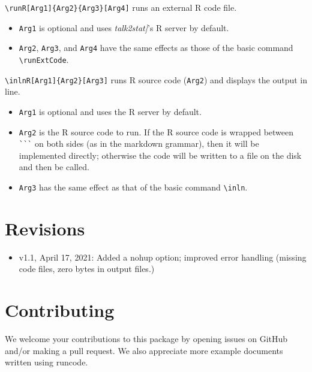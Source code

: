 \documentclass{ltxdoc}
\begin{document}
\bigskip
\noindent \verb|\runR[Arg1]{Arg2}{Arg3}[Arg4]| runs an external R code file.
\begin{itemize}
\item \texttt{Arg1} is optional and uses \textit{talk2stat]}'s R server by default.
\item \texttt{Arg2}, \texttt{Arg3}, and \texttt{Arg4} have the same effects as those of the basic command \verb|\runExtCode|. 
\end{itemize}

\noindent \verb|\inlnR[Arg1]{Arg2}[Arg3]| runs R source code (\texttt{Arg2}) and displays the output in line.
\begin{itemize}
\item \texttt{Arg1} is optional and uses the R server by default.
\item \texttt{Arg2} is the R source code to run. If the R  source code is wrapped between \verb|```| on both sides (as in the markdown grammar), then it will be implemented directly; otherwise the code will be written to a file on the disk and then be called.
\item \texttt{Arg3} has the same effect as that of the basic command  \verb|\inln|.
\end{itemize}


\section{Revisions}
\begin{itemize}
\item v1.1, April 17, 2021: Added a nohup option; improved error handling (missing code files, zero bytes in output files.)
\end{itemize}

%
\section{Contributing}
We welcome your contributions to this package by opening issues on GitHub and/or making a pull request. We also appreciate more example documents written using \textsf{runcode}.
\end{document}
